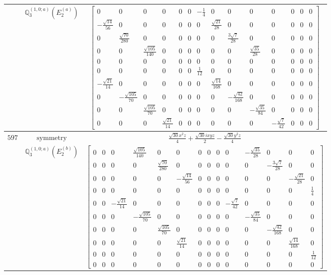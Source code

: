 \documentclass[fleqn,8pt,landscape]{jsarticle}
\begin{document}
\begin{longtable}{ccc}
$  $ & $ \mathbb{Q}_{3}^{(1,0;a)}(E_{2}^{(a)}) $ & $ \begin{bmatrix} 0 & 0 & 0 & 0 & 0 & 0 & - \frac{1}{4} & 0 & 0 & 0 & 0 & 0 & 0 & 0 \\ - \frac{\sqrt{14}}{56} & 0 & 0 & 0 & 0 & 0 & 0 & \frac{\sqrt{21}}{28} & 0 & 0 & 0 & 0 & 0 & 0 \\ 0 & \frac{\sqrt{70}}{280} & 0 & 0 & 0 & 0 & 0 & 0 & \frac{3 \sqrt{7}}{28} & 0 & 0 & 0 & 0 & 0 \\ 0 & 0 & \frac{\sqrt{105}}{140} & 0 & 0 & 0 & 0 & 0 & 0 & \frac{\sqrt{35}}{28} & 0 & 0 & 0 & 0 \\ 0 & 0 & 0 & 0 & 0 & 0 & 0 & 0 & 0 & 0 & 0 & 0 & 0 & 0 \\ 0 & 0 & 0 & 0 & 0 & 0 & \frac{1}{12} & 0 & 0 & 0 & 0 & 0 & 0 & 0 \\ - \frac{\sqrt{21}}{14} & 0 & 0 & 0 & 0 & 0 & 0 & \frac{\sqrt{14}}{168} & 0 & 0 & 0 & 0 & 0 & 0 \\ 0 & - \frac{\sqrt{105}}{70} & 0 & 0 & 0 & 0 & 0 & 0 & - \frac{\sqrt{42}}{168} & 0 & 0 & 0 & 0 & 0 \\ 0 & 0 & \frac{\sqrt{105}}{70} & 0 & 0 & 0 & 0 & 0 & 0 & - \frac{\sqrt{35}}{84} & 0 & 0 & 0 & 0 \\ 0 & 0 & 0 & \frac{\sqrt{21}}{14} & 0 & 0 & 0 & 0 & 0 & 0 & - \frac{\sqrt{7}}{42} & 0 & 0 & 0 \end{bmatrix} $ \\ \hline
$ 597 $ & $ \text{symmetry} $ & $ \frac{\sqrt{30} x^{2} z}{4} + \frac{\sqrt{30} i x y z}{2} - \frac{\sqrt{30} y^{2} z}{4} $ \\
$  $ & $ \mathbb{Q}_{3}^{(1,0;a)}(E_{2}^{(b)}) $ & $ \begin{bmatrix} 0 & 0 & 0 & \frac{\sqrt{105}}{140} & 0 & 0 & 0 & 0 & 0 & 0 & - \frac{\sqrt{35}}{28} & 0 & 0 & 0 \\ 0 & 0 & 0 & 0 & \frac{\sqrt{70}}{280} & 0 & 0 & 0 & 0 & 0 & 0 & - \frac{3 \sqrt{7}}{28} & 0 & 0 \\ 0 & 0 & 0 & 0 & 0 & - \frac{\sqrt{14}}{56} & 0 & 0 & 0 & 0 & 0 & 0 & - \frac{\sqrt{21}}{28} & 0 \\ 0 & 0 & 0 & 0 & 0 & 0 & 0 & 0 & 0 & 0 & 0 & 0 & 0 & \frac{1}{4} \\ 0 & 0 & - \frac{\sqrt{21}}{14} & 0 & 0 & 0 & 0 & 0 & 0 & - \frac{\sqrt{7}}{42} & 0 & 0 & 0 & 0 \\ 0 & 0 & 0 & - \frac{\sqrt{105}}{70} & 0 & 0 & 0 & 0 & 0 & 0 & - \frac{\sqrt{35}}{84} & 0 & 0 & 0 \\ 0 & 0 & 0 & 0 & \frac{\sqrt{105}}{70} & 0 & 0 & 0 & 0 & 0 & 0 & - \frac{\sqrt{42}}{168} & 0 & 0 \\ 0 & 0 & 0 & 0 & 0 & \frac{\sqrt{21}}{14} & 0 & 0 & 0 & 0 & 0 & 0 & \frac{\sqrt{14}}{168} & 0 \\ 0 & 0 & 0 & 0 & 0 & 0 & 0 & 0 & 0 & 0 & 0 & 0 & 0 & \frac{1}{12} \\ 0 & 0 & 0 & 0 & 0 & 0 & 0 & 0 & 0 & 0 & 0 & 0 & 0 & 0 \end{bmatrix} $ \\ \hline

\end{longtable}
\end{document}
